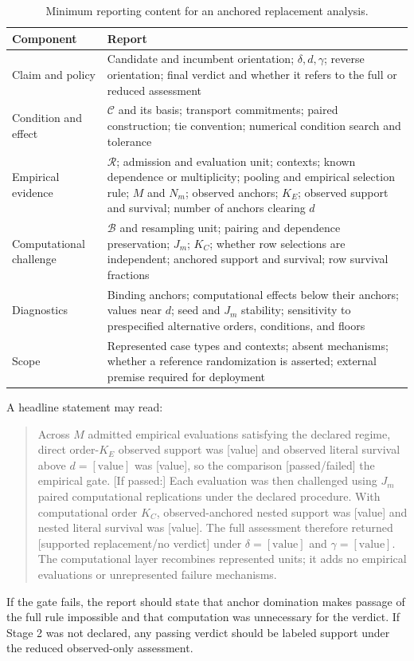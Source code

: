 \documentclass[11pt]{article}
\newcommand{\Regime}{\mathcal{R}}
\newcommand{\CSet}{\mathcal{C}}
\newcommand{\Boot}{\mathcal{B}}
\theoremstyle{remark}
\begin{document}
\begin{table}[htbp]
\centering
\caption{Minimum reporting content for an anchored replacement analysis.}
\label{tab:reporting}
\begin{tabularx}{\textwidth}{@{}>{\raggedright\arraybackslash}p{}>{\raggedright\arraybackslash}X@{}}
\toprule
Component & Report \\
\midrule
Claim and policy & Candidate and incumbent orientation; $\delta,d,\gamma$; reverse orientation; final verdict and whether it refers to the full or reduced assessment \\
Condition and effect & $\CSet$ and its basis; transport commitments; paired construction; tie convention; numerical condition search and tolerance \\
Empirical evidence & $\Regime$; admission and evaluation unit; contexts; known dependence or multiplicity; pooling and empirical selection rule; $M$ and $N_m$; observed anchors; $K_E$; observed support and survival; number of anchors clearing $d$ \\
Computational challenge & $\Boot$ and resampling unit; pairing and dependence preservation; $J_m$; $K_C$; whether row selections are independent; anchored support and survival; row survival fractions \\
Diagnostics & Binding anchors; computational effects below their anchors; values near $d$; seed and $J_m$ stability; sensitivity to prespecified alternative orders, conditions, and floors \\
Scope & Represented case types and contexts; absent mechanisms; whether a reference randomization is asserted; external premise required for deployment \\
\bottomrule
\end{tabularx}
\end{table}

A headline statement may read:
\begin{quote}
Across $M$ admitted empirical evaluations satisfying the declared
regime, direct order-$K_E$ observed support was [value] and observed literal
survival above $d=[\text{value}]$ was [value], so the comparison
[passed/failed] the empirical gate. [If passed:] Each evaluation was then
challenged using $J_m$ paired computational replications under the declared
procedure. With computational order $K_C$, observed-anchored nested support was
[value] and nested literal survival was [value]. The full assessment therefore
returned [supported replacement/no verdict] under $\delta=[\text{value}]$ and
$\gamma=[\text{value}]$. The computational layer recombines represented units;
it adds no empirical evaluations or unrepresented failure mechanisms.
\end{quote}
If the gate fails, the report should state that anchor domination makes passage
of the full rule impossible and that computation was unnecessary for the
verdict. If Stage 2 was not declared, any passing verdict should be labeled
support under the reduced observed-only assessment.
\end{document}
